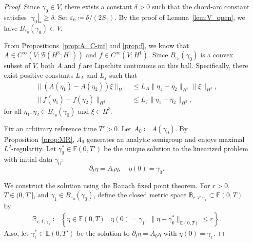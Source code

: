 \documentclass{article}
\theoremstyle{remark}
\theoremstyle{definition}
\newcommand{\relmiddle}[1]{\mathrel{}\middle#1\mathrel{}}
\numberwithin{equation}{section}
\begin{document}
\begin{proof}
    Since $\gamma_0\in V$, there exists a constant $\delta>0$ such that the chord-arc constant satisfies $|\gamma_0|_\ast\ge\delta$.
    Set $\varepsilon_0\coloneqq\delta/(2S_1)$. By the proof of Lemma~\ref{lem:V_open}, we have $B_{\varepsilon_0}(\gamma_0)\subset V$.
    
    From Propositions~\ref{prop:A_C-inf} and \ref{prop:f}, we know that $A \in C^\infty(V; \mathcal{B}(H^3; H^1))$ and $f \in C^\infty(V; H^1)$.
    Since $B_{\varepsilon_0}(\gamma_0)$ is a convex subset of $V$, both $A$ and $f$ are Lipschitz continuous on this ball.
    Specifically, there exist positive constants $L_A$ and $L_f$ such that
    \begin{align}
        \|(A(\eta_1)-A(\eta_2))\xi\|_{H^1}&\le L_A\|\eta_1-\eta_2\|_{H^2}\|\xi\|_{H^3},\label{eq:A_Lipschitz}\\
        \|f(\eta_1)-f(\eta_2)\|_{H^1}&\le L_f\|\eta_1-\eta_2\|_{H^2}, \label{eq:F_Lipschitz}
    \end{align}
    for all $\eta_1,\eta_2\in B_{\varepsilon_0}(\gamma_0)$ and $\xi\in H^3$.

    Fix an arbitrary reference time $T'>0$.
    Let $A_0 \coloneqq A(\gamma_0)$. By Proposition~\ref{prop:MR}, $A_0$ generates an analytic semigroup and enjoys maximal $L^2$-regularity.
    Let $\gamma_0^\ast \in \mathbb{E}(0,T')$ be the unique solution to the linearized problem with initial data $\gamma_0$:
    \begin{equation*}
        \partial_t \eta = A_0 \eta, \quad \eta(0) = \gamma_0.
    \end{equation*}
    
    We construct the solution using the Banach fixed point theorem.
    For $r>0$, $T\in(0,T']$, and $\gamma_1\in B_{\varepsilon_0}(\gamma_0)$, define the closed metric space $\mathbb{B}_{r,T,\gamma_1} \subset \mathbb{E}(0,T)$ by
    \begin{align*}
        \mathbb{B}_{r,T,\gamma_1} \coloneqq \left\{ \eta \in \mathbb{E}(0,T) \relmiddle| \eta(0)=\gamma_1,\ \|\eta-\gamma_0^\ast\|_{\mathbb{E}(0,T)} \le r \right\}.
    \end{align*}
    Also, let $\gamma_1^\ast \in \mathbb{E}(0,T')$ be the solution to $\partial_t \eta = A_0 \eta$ with $\eta(0) = \gamma_1$.


\end{proof}
\end{document}
